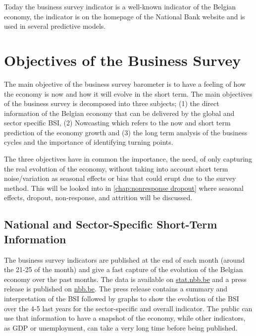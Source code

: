 \documentclass[12pt,a4paper,oneside]{book}
\begin{document}
Today the business survey indicator is a well-known indicator of the Belgian economy, the indicator is on the homepage of the National Bank website and is used in several predictive models.



\section{Objectives of the Business Survey}
\label{section:Objective}


The main objective of the business survey barometer is to have a feeling of how the economy is now and how it will evolve in the short term.
The main objectives of the business survey is decomposed into three subjects; (1) the direct information of the Belgian economy that can be delivered by the global and sector specific BSI, (2) Nowcasting which refers to the now and short term prediction of the economy growth and (3) the long term analysis of the business cycles and the importance of identifying turning points.

The three objectives have in common the importance, the need, of only capturing the real evolution of the economy, without taking into account short term noise/variation as seasonal effects or bias that could erupt due to the survey method.
This will be looked into in \autoref{chap:nonresponse dropout} where seasonal effects, dropout, non-response, and attrition will be discussed.


\subsection{National and Sector-Specific Short-Term Information}


The business survey indicators are published at the end of each month (around the 21-25 of the month) and give a fast capture of the evolution of the Belgian economy over the past months.
The data is available on \href{http://stat.nbb.be/Index.aspx?DataSetCode=BUSSURVM&Lang=en}{stat.nbb.be} and a press release is published on \href{http://www.nbb.be/doc/dq/e/conj.htm}{nbb.be}. 
The press release contains a summary and interpretation of the BSI followed by graphs to show the evolution of the BSI over the 4-5 last years for the sector-specific and overall indicator.
The public can use that information to have a snapshot of the economy, while other indicators, as GDP or unemployment, can take a very long time before being published.
\end{document}
